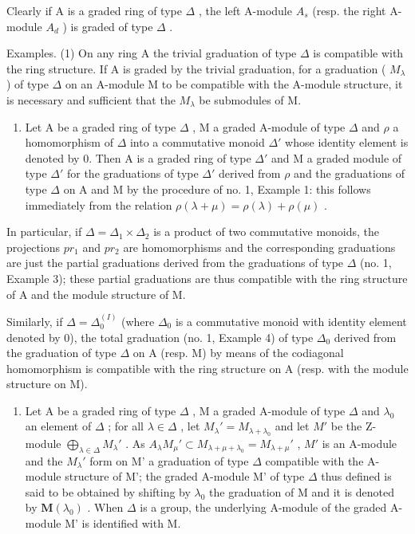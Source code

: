 Clearly if A is a graded ring of type \(\Delta\) , the left A-module \(A_{s}\) (resp. the right A-module \(A_{d}\) ) is graded of type \(\Delta\) .

Examples. (1) On any ring A the trivial graduation of type \(\Delta\) is compatible with the ring structure. If A is graded by the trivial graduation, for a graduation ( \(M_{\lambda}\) ) of type \(\Delta\) on an A-module M to be compatible with the A-module structure, it is necessary and sufficient that the \(M_{\lambda}\) be submodules of M.

\begin{enumerate}
\def\labelenumi{(\arabic{enumi})}
\setcounter{enumi}{1}
\tightlist
\item
  Let A be a graded ring of type \(\Delta\) , M a graded A-module of type \(\Delta\) and \(\rho\) a homomorphism of \(\Delta\) into a commutative monoid \(\Delta'\) whose identity element is denoted by 0. Then A is a graded ring of type \(\Delta'\) and M a graded module of type \(\Delta'\) for the graduations of type \(\Delta'\) derived from \(\rho\) and the graduations of type \(\Delta\) on A and M by the procedure of no. 1, Example 1: this follows immediately from the relation \(\rho(\lambda + \mu) = \rho(\lambda) + \rho(\mu)\) .
\end{enumerate}

In particular, if \(\Delta = \Delta_{1} \times \Delta_{2}\) is a product of two commutative monoids, the projections \(pr_{1}\) and \(pr_{2}\) are homomorphisms and the corresponding graduations are just the partial graduations derived from the graduations of type \(\Delta\) (no. 1, Example 3); these partial graduations are thus compatible with the ring structure of A and the module structure of M.

Similarly, if \(\Delta = \Delta_0^{(I)}\) (where \(\Delta_0\) is a commutative monoid with identity element denoted by 0), the total graduation (no. 1, Example 4) of type \(\Delta_0\) derived from the graduation of type \(\Delta\) on A (resp. M) by means of the codiagonal homomorphism is compatible with the ring structure on A (resp. with the module structure on M).

\begin{enumerate}
\def\labelenumi{(\arabic{enumi})}
\setcounter{enumi}{2}
\tightlist
\item
  Let A be a graded ring of type \(\Delta\) , M a graded A-module of type \(\Delta\) and \(\lambda_0\) an element of \(\Delta\) ; for all \(\lambda \in \Delta\) , let \(M_{\lambda}' = M_{\lambda + \lambda_0}\) and let \(M'\) be the Z-module \(\bigoplus_{\lambda \in \Delta} M_{\lambda}'\) . As \(A_{\lambda}M_{\mu}' \subset M_{\lambda + \mu + \lambda_0} = M_{\lambda + \mu}'\) , \(M'\) is an A-module and the \(M_{\lambda}'\) form on M' a graduation of type \(\Delta\) compatible with the A-module structure of M'; the graded A-module M' of type \(\Delta\) thus defined is said to be obtained by shifting by \(\lambda_{0}\) the graduation of M and it is denoted by \(\mathbf{M}(\lambda_{0})\) . When \(\Delta\) is a group, the underlying A-module of the graded A-module M' is identified with M.
\end{enumerate}

